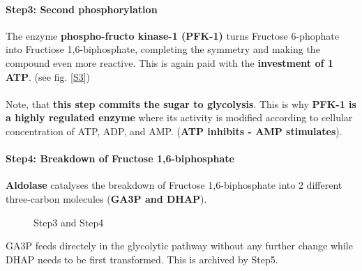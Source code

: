 \documentclass[../main.tex]{subfiles}
\begin{document}
\paragraph{Step3: Second phosphorylation}
The enzyme \textbf{phospho-fructo kinase-1 (PFK-1)} turns Fructose 6-phophate into Fructiose 1,6-biphosphate, completing the symmetry and making the compound even more reactive. This is again paid with the \textbf{investment of 1 ATP}. (see fig. \ref{S3})\\
\\
Note, that \textbf{this step commits the sugar to glycolysis}. This is why \textbf{PFK-1 is a highly regulated enzyme} where its activity is modified according to cellular concentration of ATP, ADP, and AMP. (\textbf{ATP inhibits - AMP stimulates}). 

\paragraph{Step4: Breakdown of Fructose 1,6-biphosphate}
\textbf{Aldolase} catalyses the breakdown of Fructose 1,6-biphosphate into 2 different three-carbon molecules (\textbf{GA3P and DHAP}). 
\begin{figure}[H]
	\centering
	\caption{Step3 and Step4}
\end{figure}
GA3P feeds directely in the glycolytic pathway without any further change while DHAP needs to be first transformed.  This is archived by Step5. 
\end{document}
